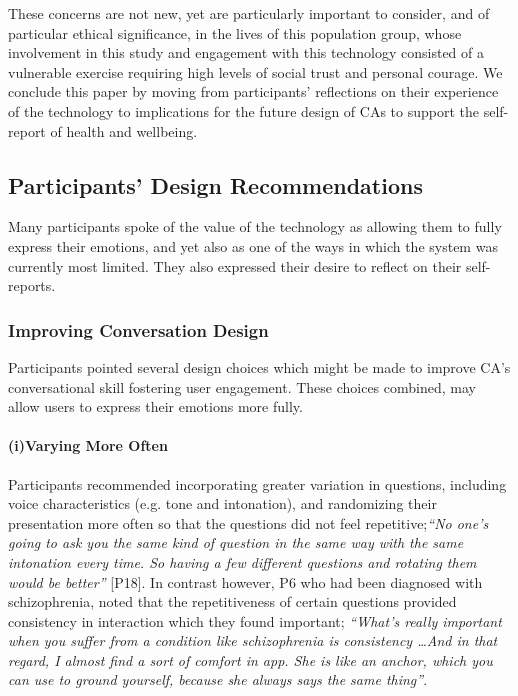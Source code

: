         \vspace{0.25cm}                
        These concerns are not new, yet are particularly important to consider, and of particular ethical significance, in the lives of this population group, whose involvement in this study and engagement with this technology consisted of a vulnerable exercise requiring high levels of social trust and personal courage. We conclude this paper by moving from participants' reflections on their experience of the technology to implications for the future design of \acp{CA} to support the self-report of health and wellbeing.
 
    \subsection{Participants' Design Recommendations }
        
        Many participants spoke of the value of the technology as allowing them to fully express their emotions, and yet also as one of the ways in which the system was currently most limited. They also expressed their desire to reflect on their self-reports.
        
        \subsubsection{Improving Conversation Design }
            
            Participants pointed several design choices which might be made to improve \ac{CA}'s conversational skill fostering user engagement. These choices combined, may allow users to express their emotions more fully.
            
            \paragraph{(i)Varying More Often}
            
                Participants recommended incorporating greater variation in questions, including voice characteristics (e.g. tone and intonation), and randomizing their presentation more often so that the questions did not feel repetitive;\textit{``No one's going to ask you the same kind of question in the same way with the same intonation every time. So having a few different questions and rotating them would be better''} [P18]. In contrast however, P6 who had been diagnosed with schizophrenia, noted that the repetitiveness of certain questions provided consistency in interaction which they found important; \textit{``What's really important when you suffer from a condition like schizophrenia is consistency \ldots And in that regard, I almost find a sort of comfort in \acl{app}. She is like an anchor, which you can use to ground yourself, because she always says the same thing''}.
            
